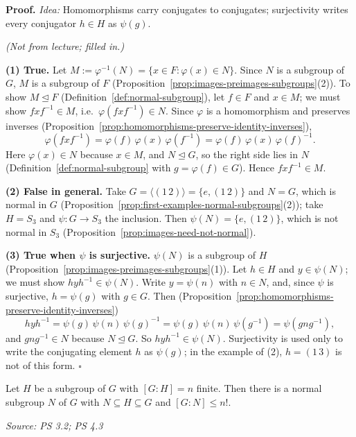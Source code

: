 \documentclass[11pt]{report}
\renewenvironment{proof}[1][Proof]{\noindent\textbf{#1.} }{\hfill$\square$\par\vspace{5pt}}
\newcommand{\srcline}[1]{\par\hfill{\footnotesize\textit{Source: #1}}}
\begin{document}
\begin{proof}
\textit{Idea:} Homomorphisms carry conjugates to conjugates; surjectivity writes every conjugator $h \in H$ as $\psi(g)$.\par
\textit{(Not from lecture; filled in.)}

\textbf{(1) True.} Let $M := \varphi^{-1}(N) = \{x \in F : \varphi(x) \in N\}$. Since $N$ is a subgroup of $G$, $M$ is a subgroup of $F$ (Proposition~\ref{prop:images-preimages-subgroups}(2)). To show $M \trianglelefteq F$ (Definition~\ref{def:normal-subgroup}), let $f \in F$ and $x \in M$; we must show $fxf^{-1} \in M$, i.e.\ $\varphi(fxf^{-1}) \in N$. Since $\varphi$ is a homomorphism and preserves inverses (Proposition~\ref{prop:homomorphisms-preserve-identity-inverses}),
\[ \varphi(fxf^{-1}) = \varphi(f)\,\varphi(x)\,\varphi(f^{-1}) = \varphi(f)\,\varphi(x)\,\varphi(f)^{-1}. \]
Here $\varphi(x) \in N$ because $x \in M$, and $N \trianglelefteq G$, so the right side lies in $N$ (Definition~\ref{def:normal-subgroup} with $g = \varphi(f) \in G$). Hence $fxf^{-1} \in M$.

\textbf{(2) False in general.} Take $G = \langle (1\,2) \rangle = \{e, (1\,2)\}$ and $N = G$, which is normal in $G$ (Proposition~\ref{prop:first-examples-normal-subgroups}(2)); take $H = S_3$ and $\psi: G \to S_3$ the inclusion. Then $\psi(N) = \{e, (1\,2)\}$, which is not normal in $S_3$ (Proposition~\ref{prop:images-need-not-normal}).

\textbf{(3) True when $\psi$ is surjective.} $\psi(N)$ is a subgroup of $H$ (Proposition~\ref{prop:images-preimages-subgroups}(1)). Let $h \in H$ and $y \in \psi(N)$; we must show $hyh^{-1} \in \psi(N)$. Write $y = \psi(n)$ with $n \in N$, and, since $\psi$ is surjective, $h = \psi(g)$ with $g \in G$. Then (Proposition~\ref{prop:homomorphisms-preserve-identity-inverses})
\[ hyh^{-1} = \psi(g)\,\psi(n)\,\psi(g)^{-1} = \psi(g)\,\psi(n)\,\psi(g^{-1}) = \psi(gng^{-1}), \]
and $gng^{-1} \in N$ because $N \trianglelefteq G$. So $hyh^{-1} \in \psi(N)$. Surjectivity is used only to write the conjugating element $h$ as $\psi(g)$; in the example of (2), $h = (1\,3)$ is not of this form.
\end{proof}

\begin{thmbox}\label{thm:normal-subgroup-inside-subgroup-finite-index}
Let $H$ be a subgroup of $G$ with $[G : H] = n$ finite. Then there is a normal subgroup $N$ of $G$ with $N \subseteq H \subseteq G$ and $[G : N] \leq n!$.
\srcline{PS 3.2; PS 4.3}
\end{thmbox}
\end{document}
